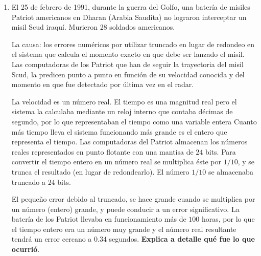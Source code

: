 \begin{enumerate}
\item El 25 de febrero de 1991, durante la guerra del Golfo, una batería de misiles Patriot americanos en Dharan (Arabia Saudita) no lograron interceptar un misil Scud iraquí. Murieron 28 soldados americanos.
\par
La causa: los errores numéricos por utilizar truncado en lugar de redondeo en el sistema que calcula el momento exacto en que debe ser lanzado el misil. Las computadoras de los Patriot que han de seguir la trayectoria del misil Scud, la predicen punto a punto en función de su velocidad conocida y del momento en que fue detectado por última vez en el radar.
\par
La velocidad es un número real. El tiempo es una magnitud real pero el sistema la calculaba mediante un reloj interno que contaba décimas de segundo, por lo que representaban el tiempo como una variable entera Cuanto más tiempo lleva el sistema funcionando más grande es el entero que representa el tiempo. Las computadoras del Patriot almacenan los números reales representados en punto flotante con una mantisa de $24$ bits. Para convertir el tiempo entero en un número real se multiplica éste por $1/10$, y se trunca el resultado (en lugar de redondearlo). El número $1/10$ se almacenaba truncado a $24$ bits.
\par
El pequeño error debido al truncado, se hace grande cuando se multiplica por un número (entero) grande, y puede conducir a un error significativo. La batería de los Patriot llevaba en funcionamiento más de $100$ horas, por lo que el tiempo entero era un número muy grande y el número real resultante tendrá un error cercano a $0.34$ segundos. \textbf{Explica a detalle qué fue lo que ocurrió}.
\end{enumerate}

